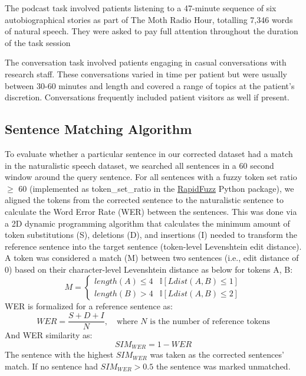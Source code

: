 \documentclass[pdflatex,sn-basic]{sn-jnl}%
\theoremstyle{thmstyleone}%
\theoremstyle{thmstyletwo}%
\theoremstyle{thmstylethree}%
\begin{document}
The podcast task involved patients listening to a 47-minute sequence of six autobiographical stories as part of The Moth Radio Hour, totalling 7,346 words of natural speech. They were asked to pay full attention throughout the duration of the task session

The conversation task involved patients engaging in casual conversations with research staff. These conversations varied in time per patient but were usually between 30-60 minutes and length and covered a range of topics at the patient’s discretion. Conversations frequently included patient visitors as well if present. 

\subsection{Sentence Matching Algorithm}\label{subsec13}
To evaluate whether a particular sentence in our corrected dataset had a match in the naturalistic speech dataset, we searched all sentences in a 60 second window around the query sentence. For all sentences with a fuzzy token set ratio $\ge$ 60 (implemented as token\_set\_ratio in the \href{https://rapidfuzz.github.io/RapidFuzz/}{RapidFuzz} Python package), we aligned the tokens from the corrected sentence to the naturalistic sentence to calculate the Word Error Rate (WER) between the sentences. This was done via a 2D dynamic programming algorithm that calculates the minimum amount of token substitutions (S), deletions (D), and insertions (I) needed to transform the reference sentence into the target sentence (token-level Levenshtein edit distance). A token was considered a match (M) between two sentences (i.e., edit distance of 0) based on their character-level Levenshtein distance as below for tokens A, B:
\[
M = \begin{cases} 
      length(A)\le4&\mathbb{I}[Ldist(A,B)\le1] \\
      length(B)>4&\mathbb{I} [Ldist(A,B)\le2]
   \end{cases}
\]
WER is formalized for a reference sentence as:
\[
WER=\frac{S+D+I}{N},\quad\text{where $N$ is the number of reference tokens}
\]
And WER similarity as:
\[
SIM_\mathit{WER}=1-WER
\]
The sentence with the highest $SIM_\mathit{WER}$ was taken as the corrected sentences’ match. If no sentence had $SIM_\mathit{WER} >0.5$ the sentence was marked unmatched.
\end{document}
